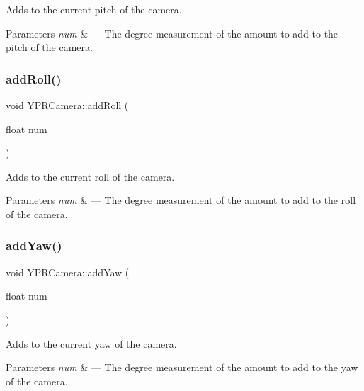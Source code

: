 Adds to the current pitch of the camera. 


\begin{DoxyParams}{Parameters}
{\em num} & --- The degree measurement of the amount to add to the pitch of the camera. \\
\hline
\end{DoxyParams}
\mbox{\label{class_y_p_r_camera_a40cd825b06e9d3b361bd3cf7c05d7b2a}} 
\subsubsection{\texorpdfstring{add\+Roll()}{addRoll()}}
{\footnotesize\ttfamily void Y\+P\+R\+Camera\+::add\+Roll (\begin{DoxyParamCaption}\item[{float}]{num }\end{DoxyParamCaption})}



Adds to the current roll of the camera. 


\begin{DoxyParams}{Parameters}
{\em num} & --- The degree measurement of the amount to add to the roll of the camera. \\
\hline
\end{DoxyParams}
\mbox{\label{class_y_p_r_camera_abca416bb77e38db7526e54e139153554}} 
\subsubsection{\texorpdfstring{add\+Yaw()}{addYaw()}}
{\footnotesize\ttfamily void Y\+P\+R\+Camera\+::add\+Yaw (\begin{DoxyParamCaption}\item[{float}]{num }\end{DoxyParamCaption})}



Adds to the current yaw of the camera. 


\begin{DoxyParams}{Parameters}
{\em num} & --- The degree measurement of the amount to add to the yaw of the camera. \\
\hline
\end{DoxyParams}
\mbox{\label{class_y_p_r_camera_a7a8964c4ec47fea7ffd7942449237788}} 
